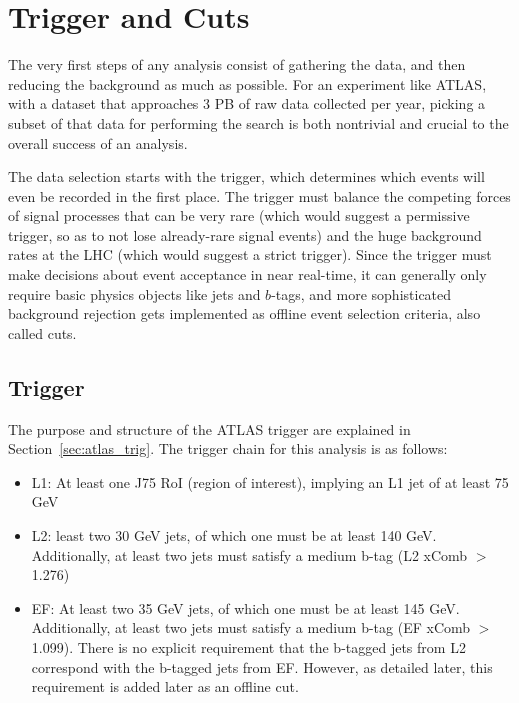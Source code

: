  

\chapter[Trigger and Cuts]{Trigger and Cuts}

The very first steps of any analysis consist of gathering the data, and then reducing the background
as much as possible.  For an experiment like ATLAS, with a dataset that approaches 3 PB of raw
data collected per year, picking a subset of that data for performing the search is both nontrivial
and crucial to the overall success of an analysis.  

The data selection starts with the trigger, which determines which events will even be recorded in the
first place.  The trigger must balance the competing forces of signal processes that can be very rare
(which would suggest a permissive trigger, so as to not lose already-rare signal events) and the
huge background rates at the LHC (which would suggest a strict trigger).  Since the trigger must make
decisions about event acceptance in near real-time, it can generally only require basic physics objects
like jets and $b$-tags, and more sophisticated background rejection gets implemented as offline event 
selection criteria, also called cuts.  

 
\section{Trigger}
\label{sec:my_trigger}
The purpose and structure of the ATLAS trigger are explained in Section~\ref{sec:atlas_trig}.  The trigger chain for this analysis is as follows: 

\begin{itemize}
    \item L1: At least one J75 RoI (region of interest), implying an L1 jet of at least 75 GeV
    \item L2: least two 30 GeV jets, of which one must be at least 140 GeV. Additionally, at least two
jets must satisfy a medium b-tag (L2 xComb $>$ 1.276)
    \item EF: At least two 35 GeV jets, of which one must be at least 145 GeV. Additionally, at least two
jets must satisfy a medium b-tag (EF xComb $>$ 1.099). There is no explicit requirement that the
b-tagged jets from L2 correspond with the b-tagged jets from EF. However, as detailed later, this
requirement is added later as an offline cut.
\end{itemize}


